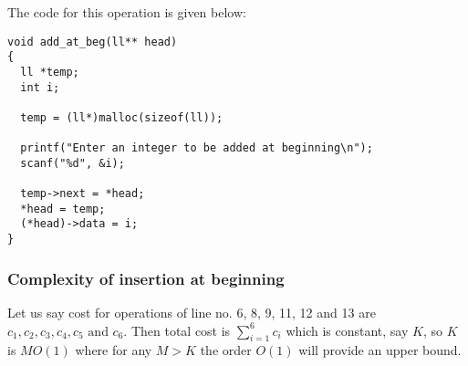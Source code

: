 \documentclass[aspectratio=1610]{beamer}
\begin{document}
\begin{frame}[fragile]
\begin{center}
\end{center}
The code for this operation is given below:
\begin{verbatim}
void add_at_beg(ll** head)
{
  ll *temp;
  int i;

  temp = (ll*)malloc(sizeof(ll));

  printf("Enter an integer to be added at beginning\n");
  scanf("%d", &i);

  temp->next = *head;
  *head = temp;
  (*head)->data = i;
}
\end{verbatim}
\end{frame}
\begin{frame}
\frametitle{Complexity of insertion at beginning}
Let us say cost for operations of line no. 6, 8, 9, 11, 12 and 13 are
$c_1, c_2, c_3, c_4, c_5 \text{ and } c_6$. Then total cost is
$\sum_{i=1}^6 c_i$ which is constant, say $K$, so $K$ is $MO(1)$ where
for any $M>K$ the order $O(1)$ will provide an upper bound.
\end{frame}
\end{document}
